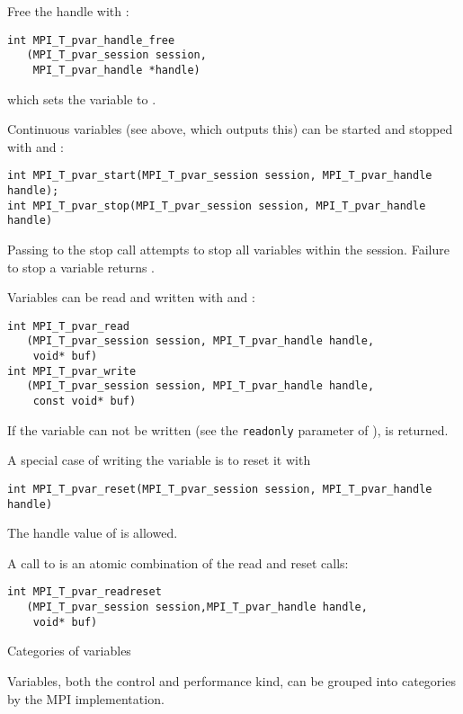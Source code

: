 Free the handle with :
\begin{lstlisting}
int MPI_T_pvar_handle_free
   (MPI_T_pvar_session session,
    MPI_T_pvar_handle *handle)
\end{lstlisting}
which sets the variable to .

Continuous variables (see  above, which outputs this)
can be started and stopped with
 and :
\begin{lstlisting}
int MPI_T_pvar_start(MPI_T_pvar_session session, MPI_T_pvar_handle handle);
int MPI_T_pvar_stop(MPI_T_pvar_session session, MPI_T_pvar_handle handle)
\end{lstlisting}
Passing  to the stop call
attempts to stop all variables within the session.
Failure to stop a variable returns .

Variables can be read and written with
 and :
\begin{lstlisting}
int MPI_T_pvar_read
   (MPI_T_pvar_session session, MPI_T_pvar_handle handle,
    void* buf)
int MPI_T_pvar_write
   (MPI_T_pvar_session session, MPI_T_pvar_handle handle,
    const void* buf)
\end{lstlisting}
If the variable can not be written
(see the \lstinline{readonly} parameter of ),
  is returned.

A special case of writing the variable is to reset it with
\begin{lstlisting}
int MPI_T_pvar_reset(MPI_T_pvar_session session, MPI_T_pvar_handle handle)  
\end{lstlisting}
The handle value of  is allowed.

A call to 
is an atomic combination of the read and reset calls:
\begin{lstlisting}
int MPI_T_pvar_readreset
   (MPI_T_pvar_session session,MPI_T_pvar_handle handle, 
    void* buf)
\end{lstlisting}


 {Categories of variables}

Variables, both the control and performance kind,
can be grouped into categories by the MPI implementation.

